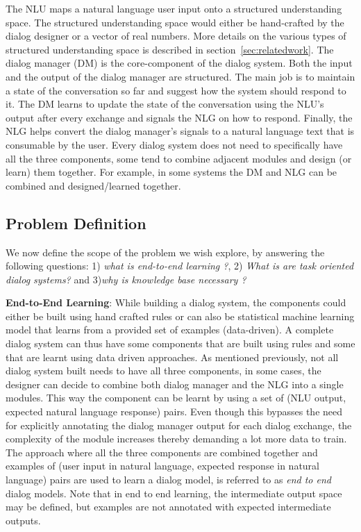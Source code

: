 The NLU maps a natural language user input onto a structured understanding space. The structured understanding space would either be hand-crafted by the dialog designer or a vector of real numbers. More details on the various types of structured understanding space is described in section~\ref{sec:relatedwork}. The dialog manager (DM) is the core-component of the dialog system. Both the input and the output of the dialog manager are structured. The main job is to maintain a state of the conversation so far and suggest how the system should respond to it. The DM learns to update the state of the conversation using the NLU's output after every exchange and signals the NLG on how to respond. Finally, the NLG helps convert the dialog manager's signals to a natural language text that is consumable by the user. Every dialog system does not need to specifically have all the three components, some tend to combine adjacent modules and design (or learn) them together. For example, in some systems the DM and NLG can be combined and designed/learned together.

\subsection{Problem Definition}

We now define the scope of the problem we wish explore, by answering the following questions: 1) \textit{what is end-to-end learning ?}, 2) \textit{What is are task oriented dialog systems?} and 3)\textit{why is knowledge base necessary ?}

\textbf{End-to-End Learning}:  While building a dialog system, the components could either be built using hand crafted rules or can also be statistical machine learning model that learns from a provided set of examples (data-driven). A complete dialog system can thus have some components that are built using rules and some that are learnt using data driven approaches. As mentioned previously, not all dialog system built needs to have all three components, in some cases, the designer can decide to combine both dialog manager and the NLG into a single modules. This way the component can be learnt by using a set of (NLU output, expected natural language response) pairs. Even though this bypasses the need for explicitly annotating the dialog manager output for each dialog exchange, the complexity of the module increases thereby demanding a lot more data to train. The approach where all the three components are combined together and examples of (user input in natural language, expected response in natural language) pairs are used to learn a dialog model, is referred to as \textit{end to end} dialog models. Note that in end to end learning, the intermediate output space may be  defined, but examples are not annotated with expected intermediate outputs.

